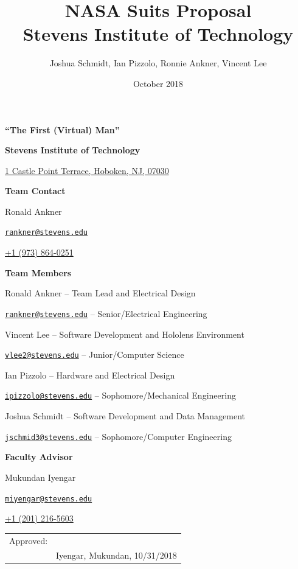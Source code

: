 \documentclass{article}
\title{%
	NASA Suits Proposal \\
	\large Stevens Institute of Technology}
\date{October 2018}
\author{Joshua Schmidt, Ian Pizzolo, Ronnie Ankner, Vincent Lee}
\begin{document}
\maketitle

\newpage

\tableofcontents

\newpage

\begin{center}

\textbf{“The First (Virtual) Man”}

\bigskip
\bigskip

\textbf{Stevens Institute of Technology}

\href{http://maps.google.com/?q=1+Castle+Point+Terrace,+Hoboken,+NJ,+07030}{1 Castle Point Terrace, Hoboken, NJ, 07030}

\bigskip
\bigskip

\textbf{Team Contact}

Ronald Ankner

\href{mailto:rankner@stevens.edu}{\nolinkurl{rankner@stevens.edu}}

\href{tel:19738640251}{+1 (973) 864-0251}

\bigskip
\bigskip

\textbf{Team Members}

Ronald Ankner -- Team Lead and Electrical Design

\href{mailto:rankner@stevens.edu}{\nolinkurl{rankner@stevens.edu}} -- Senior/Electrical Engineering

\bigskip
\bigskip

Vincent Lee -- Software Development and Hololens Environment

\href{mailto:vlee2@stevens.edu}{\nolinkurl{vlee2@stevens.edu}} -- Junior/Computer Science

\bigskip
\bigskip

Ian Pizzolo -- Hardware and Electrical Design

\href{mailto:ipizzolo@stevens.edu}{\nolinkurl{ipizzolo@stevens.edu}} -- Sophomore/Mechanical Engineering

\bigskip
\bigskip

Joshua Schmidt -- Software Development and Data Management

\href{mailto:jschmid3@stevens.edu}{\nolinkurl{jschmid3@stevens.edu}} -- Sophomore/Computer Engineering

\bigskip
\bigskip

\textbf{Faculty Advisor}

Mukundan Iyengar

\href{mailto:miyengar@stevens.edu}{\nolinkurl{miyengar@stevens.edu}}

\href{tel:12012165603}{+1 (201) 216-5603}

\bigskip
\bigskip
\bigskip
\bigskip
\bigskip
\bigskip
\bigskip
\bigskip
\bigskip
\bigskip
\bigskip

\begin{tabular}{@{}p{.5in}p{3.5in}@{}}
Approved: & \hrulefill \\
& Iyengar, Mukundan, 10/31/2018\\
\end{tabular}

\end{center}
\end{document}
